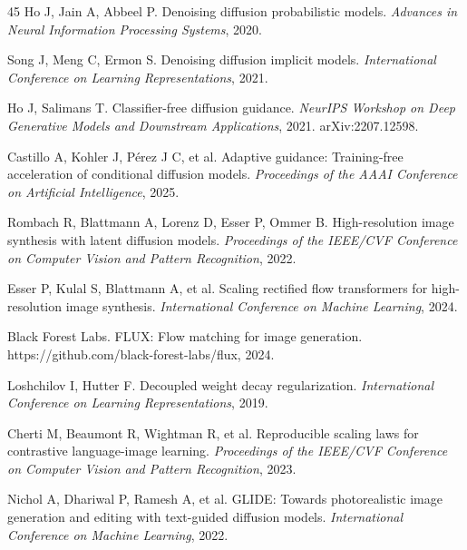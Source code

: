 \documentclass[times,twocolumn,final]{elsarticle}
\providecommand{\DIFdel}[1]{{\protect\color{red} \scriptsize #1}} %
\providecommand{\DIFaddend}{} %
\providecommand{\DIFdelbegin}{} %
\begin{document}
\begin{thebibliography}{45}
\DIFaddend {}
Ho J, Jain A, Abbeel P. Denoising diffusion probabilistic models. \textit{Advances in Neural Information Processing Systems}, 2020.

Song J, Meng C, Ermon S. Denoising diffusion implicit models. \textit{International Conference on Learning Representations}, 2021.

Ho J, Salimans T. Classifier-free diffusion guidance. \textit{NeurIPS Workshop on Deep Generative Models and Downstream Applications}, 2021. arXiv:2207.12598.

Castillo A, Kohler J, P\'erez J C, et al. Adaptive guidance: Training-free acceleration of conditional diffusion models. \textit{Proceedings of the AAAI Conference on Artificial Intelligence}, 2025.

\DIFdelbegin %
\DIFdel{Rombach R, Blattmann A, Lorenz D, Esser P, Ommer B. High-resolution image synthesis with latent diffusion models. \textit{Proceedings of the IEEE/CVF Conference on Computer Vision and Pattern Recognition}, 2022.
}%

\DIFdel{Esser P, Kulal S, Blattmann A, et al. Scaling rectified flow transformers for high-resolution image synthesis. \textit{International Conference on Machine Learning}, 2024.
}%

\DIFdel{Black Forest Labs. FLUX: Flow matching for image generation. https://github.com/black-forest-labs/flux, 2024.
}%

\DIFdel{Loshchilov I, Hutter F. Decoupled weight decay regularization. \textit{International Conference on Learning Representations}, 2019.
}%

\DIFdel{Cherti M, Beaumont R, Wightman R, et al. Reproducible scaling laws for contrastive language-image learning. \textit{Proceedings of the IEEE/CVF Conference on Computer Vision and Pattern Recognition}, 2023.
}%

\DIFdel{Nichol A, Dhariwal P, Ramesh A, et al. GLIDE: Towards photorealistic image generation and editing with text-guided diffusion models. \textit{International Conference on Machine Learning}, 2022.
}%


\end{thebibliography}
\end{document}
